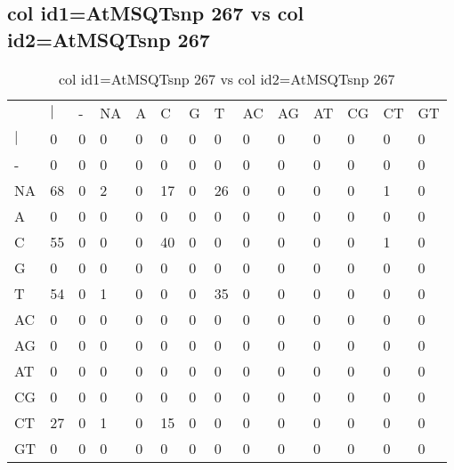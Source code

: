 \subsection{col id1=AtMSQTsnp 267 vs col id2=AtMSQTsnp 267}
\begin{center}
\begin{longtable}{|l|l|l|l|l|l|l|l|l|l|l|l|l|l|}
\caption{col id1=AtMSQTsnp 267 vs col id2=AtMSQTsnp 267} \label{table_dm812}\\
\hline
\\
\hline
&$|$&-&NA&A&C&G&T&AC&AG&AT&CG&CT&GT\\
$|$&0&0&0&0&0&0&0&0&0&0&0&0&0\\
-&0&0&0&0&0&0&0&0&0&0&0&0&0\\
NA&68&0&2&0&17&0&26&0&0&0&0&1&0\\
A&0&0&0&0&0&0&0&0&0&0&0&0&0\\
C&55&0&0&0&40&0&0&0&0&0&0&1&0\\
G&0&0&0&0&0&0&0&0&0&0&0&0&0\\
T&54&0&1&0&0&0&35&0&0&0&0&0&0\\
AC&0&0&0&0&0&0&0&0&0&0&0&0&0\\
AG&0&0&0&0&0&0&0&0&0&0&0&0&0\\
AT&0&0&0&0&0&0&0&0&0&0&0&0&0\\
CG&0&0&0&0&0&0&0&0&0&0&0&0&0\\
CT&27&0&1&0&15&0&0&0&0&0&0&0&0\\
GT&0&0&0&0&0&0&0&0&0&0&0&0&0\\
\hline
\end{longtable}
\end{center}

